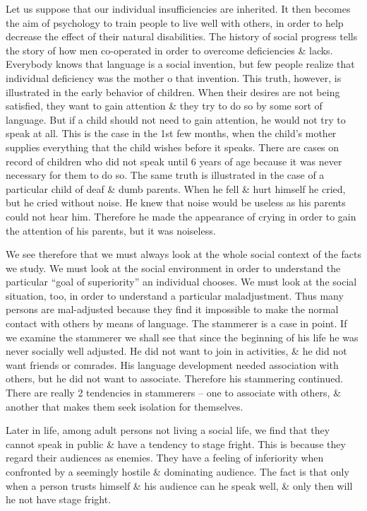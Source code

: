 \documentclass{article}
\begin{document}
Let us suppose that our individual insufficiencies are inherited. It then becomes the aim of psychology to train people to live well with others, in order to help decrease the effect of their natural disabilities. The history of social progress tells the story of how men co-operated in order to overcome deficiencies \& lacks. Everybody knows that language is  a social invention, but few people realize that individual deficiency was the mother o that invention. This truth, however, is illustrated in the early behavior of children. When their desires are not being satisfied, they want to gain attention \& they try to do so by some sort of language. But if a child should not need to gain attention, he would not try to speak at all. This is the case in the 1st few months, when the child's mother supplies everything that the child wishes before it speaks. There are cases on record of children who did not speak until 6 years of age because it was never necessary for them to do so. The same truth is illustrated in the case of a particular child of deaf \& dumb parents. When he fell \& hurt himself he cried, but he cried without noise. He knew that noise would be useless as his parents could not hear him. Therefore he made the appearance of crying in order to gain the attention of his parents, but it was noiseless.

We see therefore that we must always look at the whole social context of the facts we study. We must look at the social environment in order to understand the particular ``goal of superiority'' an individual chooses. We must look at the social situation, too, in order to understand a particular maladjustment. Thus many persons are mal-adjusted because they find it impossible to make the normal contact with others by means of language. The stammerer is a case in point. If we examine the stammerer we shall see that since the beginning of his life he was never socially well adjusted. He did not want to join in activities, \& he did not want friends or comrades. His language development needed association with others, but he did not want to associate. Therefore his stammering continued. There are really 2 tendencies in stammerers -- one to associate with others, \& another that makes them seek isolation for themselves.

Later in life, among adult persons not living a social life, we find that they cannot speak in public \& have a tendency to stage fright. This is because they regard their audiences as enemies. They have a feeling of inferiority when confronted by a seemingly hostile \& dominating audience. The fact is that only when a person trusts himself \& his audience can he speak well, \& only then will he not have stage fright.
\end{document}
